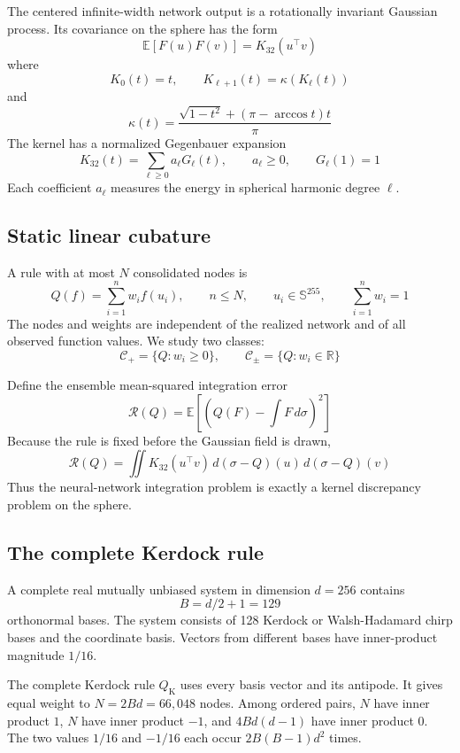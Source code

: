 \documentclass[11pt]{article}
\begin{document}
The centered infinite-width network output is a rotationally invariant
Gaussian process. Its covariance on the sphere has the form \[
\mathbb{E}[F(u)F(v)] = K_{32}(u^\top v)
\] where \[
K_0(t)=t, \qquad K_{\ell+1}(t)=\kappa(K_\ell(t))
\] and \[
\kappa(t)=\frac{\sqrt{1-t^2}+(\pi-\arccos t)t}{\pi}
\] The kernel has a normalized Gegenbauer expansion \[
K_{32}(t)=\sum_{\ell\geq 0} a_\ell G_\ell(t),
\qquad a_\ell\geq 0,
\qquad G_\ell(1)=1
\] Each coefficient \(a_\ell\) measures the energy in spherical harmonic
degree \(\ell\).

\subsection{Static linear cubature}\label{static-linear-cubature}

A rule with at most \(N\) consolidated nodes is \[
Q(f)=\sum_{i=1}^{n} w_i f(u_i),
\qquad n\leq N,
\qquad u_i\in\mathbb{S}^{255},
\qquad \sum_{i=1}^{n}w_i=1
\] The nodes and weights are independent of the realized network and of
all observed function values. We study two classes: \[
\mathcal{C}_{+}=\{Q:w_i\geq0\},
\qquad
\mathcal{C}_{\pm}=\{Q:w_i\in\mathbb{R}\}
\]

Define the ensemble mean-squared integration error \[
\mathcal{R}(Q)
=\mathbb{E}\left[
\left(Q(F)-\int F\,d\sigma\right)^2
\right]
\] Because the rule is fixed before the Gaussian field is drawn, \[
\mathcal{R}(Q)
=\iint K_{32}(u^\top v)\,d(\sigma-Q)(u)\,d(\sigma-Q)(v)
\] Thus the neural-network integration problem is exactly a kernel
discrepancy problem on the sphere.

\subsection{The complete Kerdock rule}\label{the-complete-kerdock-rule}

A complete real mutually unbiased system in dimension \(d=256\) contains
\[
B=d/2+1=129
\] orthonormal bases. The system consists of 128 Kerdock or
Walsh-Hadamard chirp bases and the coordinate basis. Vectors from
different bases have inner-product magnitude \(1/16\).

The complete Kerdock rule \(Q_{\mathrm K}\) uses every basis vector and
its antipode. It gives equal weight to \(N=2Bd=66{,}048\) nodes. Among
ordered pairs, \(N\) have inner product \(1\), \(N\) have inner product
\(-1\), and \(4Bd(d-1)\) have inner product \(0\). The two values
\(1/16\) and \(-1/16\) each occur \(2B(B-1)d^2\) times.
\end{document}
